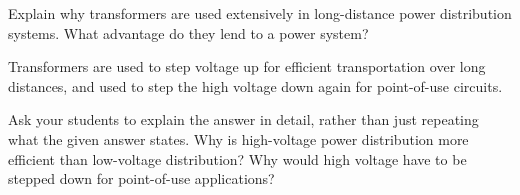 

Explain why transformers are used extensively in long-distance power distribution systems.  What advantage do they lend to a power system?







Transformers are used to step voltage up for efficient transportation over long distances, and used to step the high voltage down again for point-of-use circuits.







Ask your students to explain the answer in detail, rather than just repeating what the given answer states.  Why is high-voltage power distribution more efficient than low-voltage distribution?  Why would high voltage have to be stepped down for point-of-use applications?




